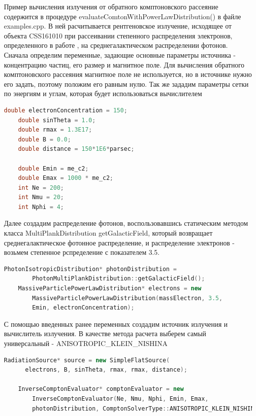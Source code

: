 Пример вычисления излучения от обратного комптоновского рассеяние содержится в процедуре evaluateComtonWithPowerLawDistribution() в файле examples.cpp. В ней расчитывается рентгеновское излучение, исходящее от объекта CSS161010 при рассеивании степенного распределения электронов, определенного в работе \cite{Coppejans2020}, на среднегалактическом распределении фотонов.  Сначала определим переменные, задающие основные параметры источника - концентрацию частиц, его размер и магнитное поле. Для вычисления обратного комптоновского рассеяния магнитное поле не используется, но в источнике нужно его задать, поэтому положим его равным нулю. Так же зададим параметры сетки по энергиям и углам, которая будет использоваться вычислителем

\begin{lstlisting}[language=c++]
	double electronConcentration = 150;
	double sinTheta = 1.0;
	double rmax = 1.3E17;
	double B = 0.0;
	double distance = 150*1E6*parsec;
	
	double Emin = me_c2;
	double Emax = 1000 * me_c2;
	int Ne = 200;
	int Nmu = 20;
	int Nphi = 4;
\end{lstlisting}

Далее создадим распределение фотонов, воспользовавшись статическим методом класса MultiPlankDistribution getGalacticField, который возвращает среднегалактическое фотонное распределение, и распределение электронов - возьмем степенное рспределение с показателем 3.5.
\begin{lstlisting}[language=c++]
	PhotonIsotropicDistribution* photonDistribution = 
	    PhotonMultiPlankDistribution::getGalacticField();
	MassiveParticlePowerLawDistribution* electrons = new 
	    MassiveParticlePowerLawDistribution(massElectron, 3.5,
	    Emin, electronConcentration);
\end{lstlisting}

С помощью введенных ранее переменных создадим источник излучения и вычислитель излучения. В качестве метода расчета выберем самый универсальный - ANISOTROPIC\_KLEIN\_NISHINA

\begin{lstlisting}[language=c++]
	RadiationSource* source = new SimpleFlatSource(
	  electrons, B, sinTheta, rmax, rmax, distance);
	
	InverseComptonEvaluator* comptonEvaluator = new 
	    InverseComptonEvaluator(Ne, Nmu, Nphi, Emin, Emax, 
	    photonDistribution, ComptonSolverType::ANISOTROPIC_KLEIN_NISHINA);
\end{lstlisting}

